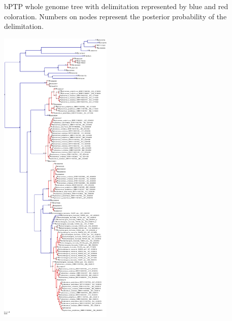 \documentclass[11pt]{article}
\begin{document}
\begin{suppfigure}
\centering
\caption{
bPTP whole genome tree with delimitation represented by blue and red coloration. Numbers on nodes represent the posterior probability of the delimitation.
}
\includegraphics[width=0.4\textwidth]{supplementaryinfo/bptp.pdf}
\label{fig:bptptree}
\end{suppfigure}
\clearpage
\end{document}

